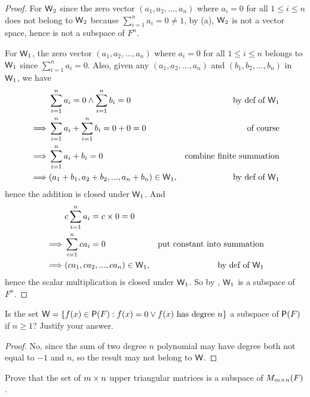 \begin{proof}
For \(\textsf{W}_2\) since the zero vector \((a_1, a_2, ..., a_n)\) where \(a_i = 0\) for all \(1 \le i \le n\) does not belong to \(\textsf{W}_2\) because \(\sum_{i = 1}^{n} a_i = 0 \ne 1\), by (a), \(\textsf{W}_2\) is not a vector space, hence is not a subspace of \(F^n\).

For \(\textsf{W}_1\), the zero vector \((a_1, a_2, ..., a_n)\) where \(a_i = 0\) for all \(1 \le i \le n\) belongs to \(\textsf{W}_1\) since \(\sum_{i = 1}^{n} a_i = 0\).
Also, given any \((a_1, a_2, ..., a_n)\) and \((b_1, b_2, ..., b_n)\) in \(\textsf{W}_1\), we have
\begin{align*}
             & \sum_{i = 1}^{n} a_i = 0 \land \sum_{i = 1}^{n} b_i = 0 & \text{by def of \(\textsf{W}_1\)} \\
    \implies & \sum_{i = 1}^{n} a_i + \sum_{i = 1}^{n} b_i = 0 + 0 = 0 & \text{of course} \\
    \implies & \sum_{i = 1}^{n} a_i + b_i = 0 & \text{combine finite summation} \\
    \implies & (a_1 + b_1, a_2 + b_2, ..., a_n + b_n) \in \textsf{W}_1, & \text{by def of \(\textsf{W}_1\)}
\end{align*}
hence the addition is closed under \(\textsf{W}_1\).
And
\begin{align*}
             & c \sum_{i = 1}^{n} a_i = c \times 0 = 0 \\
    \implies & \sum_{i = 1}^{n} c a_i = 0 & \text{put constant into summation} \\
    \implies & (c a_1, c a_2, ..., c a_n) \in \textsf{W}_1, & \text{by def of \(\textsf{W}_1\)}
\end{align*}
hence the scalar multiplication is closed under \(\textsf{W}_1\).
So by , \(\textsf{W}_1\) is a subspace of \(F^n\).
\end{proof}

\begin{exercise} \label{exercise 1.3.11}
Is the set \(\textsf{W} = \{f(x) \in \textsf{P}(F): f(x) = 0 \lor f(x) \text{ has degree } n\}\) a subspace of \(\textsf{P}(F)\) if \(n \ge 1\)?
Justify your answer.
\end{exercise}

\begin{proof}
No, since the sum of two degree \(n\) polynomial may have degree both not equal to \(-1\) and \(n\), so the result may not belong to \(\textsf{W}\).
\end{proof}

\begin{exercise} \label{exercise 1.3.12}
Prove that the set of \(m \times n\) upper triangular matrices is a subspace of \(M_{m \times n}(F)\).
\end{exercise}

